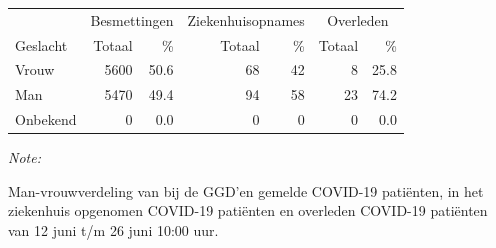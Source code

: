 \documentclass[
  english,
  man,floatsintext]{apa6}
\begin{document}
\begin{table}
\centering\begingroup\fontsize{11}{13}\selectfont

\begin{threeparttable}
\begin{tabular}{lrrrrrr}
\toprule
\multicolumn{1}{c}{ } & \multicolumn{2}{c}{Besmettingen} & \multicolumn{2}{c}{Ziekenhuisopnames} & \multicolumn{2}{c}{Overleden} \\
\cmidrule(l{3pt}r{3pt}){2-3} \cmidrule(l{3pt}r{3pt}){4-5} \cmidrule(l{3pt}r{3pt}){6-7}
Geslacht & Totaal & \% & Totaal & \% & Totaal & \%\\
\midrule
Vrouw & 5600 & 50.6 & 68 & 42 & 8 & 25.8\\
Man & 5470 & 49.4 & 94 & 58 & 23 & 74.2\\
Onbekend & 0 & 0.0 & 0 & 0 & 0 & 0.0\\
\bottomrule
\end{tabular}
\begin{tablenotes}
\item \textit{Note: } 
\item Man-vrouwverdeling van bij de GGD’en gemelde COVID-19 patiënten, in het ziekenhuis opgenomen COVID-19 patiënten en overleden COVID-19 patiënten van 12 juni t/m 26 juni 10:00 uur.
\end{tablenotes}
\end{threeparttable}
\endgroup{}
\end{table}
\newpage
\end{document}
